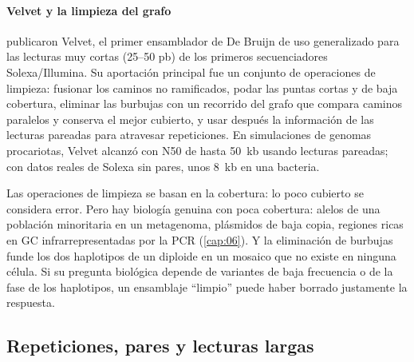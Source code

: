\paragraph{Velvet y la limpieza del grafo} \textcite{c08-zerbino2008} publicaron Velvet, el primer ensamblador de De Bruijn de uso generalizado para las lecturas muy cortas (25--50 pb) de los primeros secuenciadores Solexa/Illumina. Su aportación principal fue un conjunto de operaciones de limpieza: fusionar los caminos no ramificados, podar las puntas cortas y de baja cobertura, eliminar las burbujas con un recorrido del grafo que compara caminos paralelos y conserva el mejor cubierto, y usar después la información de las lecturas pareadas para atravesar repeticiones. En simulaciones de genomas procariotas, Velvet alcanzó  con N50 de hasta \SI{50}{kb} usando lecturas pareadas; con datos reales de Solexa sin pares, unos \SI{8}{kb} en una bacteria.

\begin{cuidado}
Las operaciones de limpieza se basan en la cobertura: lo poco cubierto se considera error. Pero hay biología genuina con poca cobertura: alelos de una población minoritaria en un metagenoma, plásmidos de baja copia, regiones ricas en GC infrarrepresentadas por la PCR (\cref{cap:06}). Y la eliminación de burbujas funde los dos haplotipos de un diploide en un mosaico que no existe en ninguna célula. Si su pregunta biológica depende de variantes de baja frecuencia o de la fase de los haplotipos, un ensamblaje ``limpio'' puede haber borrado justamente la respuesta.
\end{cuidado}

\subsection{Repeticiones, pares y lecturas largas}

